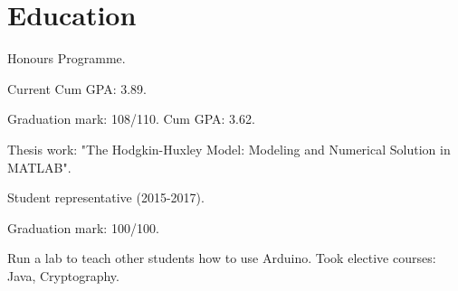 \documentclass[a4paper]{deedy-resume} %
\begin{document}
\hfill
%
%
\begin{minipage}[t]{0.66\textwidth} %


\section{Education}


\vspace{\topsep} %
\begin{tightitemize}
\item Honours Programme.
\item Current Cum GPA: 3.89.
\end{tightitemize}

\sectionspace %



\begin{tightitemize}
\item Graduation mark: 108/110. Cum GPA: 3.62.
\item Thesis work: "The Hodgkin-Huxley Model: Modeling and Numerical Solution in MATLAB".
\item Student representative (2015-2017).
\end{tightitemize}

\sectionspace %



\begin{tightitemize}
	\item Graduation mark: 100/100.
	\item Run a lab to teach other students how to use Arduino. Took elective courses: Java, Cryptography.


\end{tightitemize}
\end{minipage}
\end{document}

